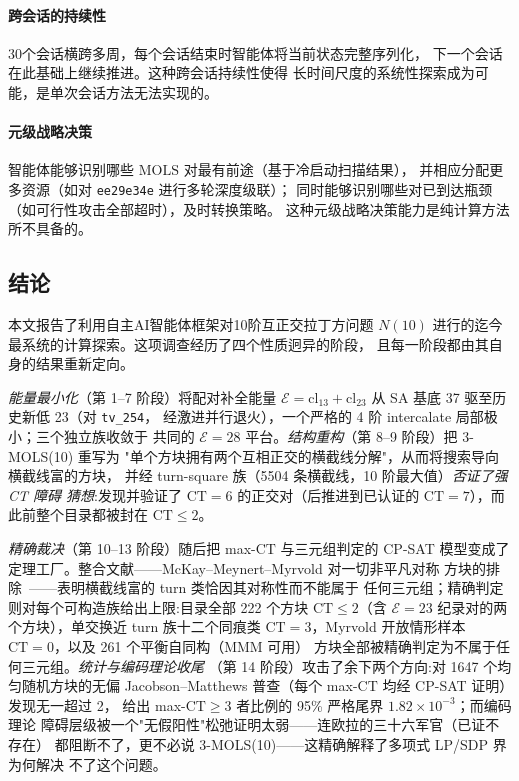 \documentclass[11pt,a4paper]{ctexart}
\theoremstyle{remark}
\newcommand{\CT}{\mathrm{CT}}
\newcommand{\cl}{\mathrm{cl}}
\newcommand{\E}{\mathcal{E}}
\newcommand{\MOLS}{\mathrm{MOLS}}
\begin{document}
\paragraph{跨会话的持续性}
30个会话横跨多周，每个会话结束时智能体将当前状态完整序列化，
下一个会话在此基础上继续推进。这种跨会话持续性使得
长时间尺度的系统性探索成为可能，是单次会话方法无法实现的。

\paragraph{元级战略决策}
智能体能够识别哪些 $\MOLS$ 对最有前途（基于冷启动扫描结果），
并相应分配更多资源（如对 \texttt{ee29e34e} 进行多轮深度级联）；
同时能够识别哪些对已到达瓶颈（如可行性攻击全部超时），及时转换策略。
这种元级战略决策能力是纯计算方法所不具备的。

\subsection{结论}

本文报告了利用自主AI智能体框架对10阶互正交拉丁方问题 $N(10)$
进行的迄今最系统的计算探索。这项调查经历了四个性质迥异的阶段，
且每一阶段都由其自身的结果重新定向。

\emph{能量最小化}（第 1--7 阶段）将配对补全能量
$\E = \cl_{13} + \cl_{23}$ 从 SA 基底 37 驱至历史新低 23（对 \texttt{tv\_254}，
经激进并行退火），一个严格的 4 阶 intercalate 局部极小；三个独立族收敛于
共同的 $\E=28$ 平台。\emph{结构重构}（第 8--9 阶段）把 3-MOLS(10) 重写为
"单个方块拥有两个互相正交的横截线分解"，从而将搜索导向横截线富的方块，
并经 turn-square 族（5504 条横截线，10 阶最大值）\emph{否证了强 CT 障碍
猜想}:发现并验证了 $\CT = 6$ 的正交对（后推进到已认证的 $\CT = 7$），而
此前整个目录都被封在 $\CT \le 2$。

\emph{精确裁决}（第 10--13 阶段）随后把 max-$\CT$ 与三元组判定的 CP-SAT
模型变成了定理工厂。整合文献——McKay--Meynert--Myrvold 对一切非平凡对称
方块的排除~\cite{mmm2007}——表明横截线富的 turn 类恰因其对称性而不能属于
任何三元组；精确判定则对每个可构造族给出上限:目录全部 222 个方块
$\CT \le 2$（含 $\E=23$ 纪录对的两个方块），单交换近 turn 族十二个同痕类
$\CT = 3$，Myrvold 开放情形样本 $\CT = 0$，以及 261 个平衡自同构（MMM 可用）
方块全部被精确判定为不属于任何三元组。\emph{统计与编码理论收尾}
（第 14 阶段）攻击了余下两个方向:对 1647 个均匀随机方块的无偏
Jacobson--Matthews 普查（每个 max-$\CT$ 均经 CP-SAT 证明）发现无一超过 2，
给出 max-$\CT \geq 3$ 者比例的 95\% 严格尾界 $1.82\times10^{-3}$；而编码理论
障碍层级被一个"无假阳性"松弛证明太弱——连欧拉的三十六军官（已证不存在）
都阻断不了，更不必说 3-MOLS(10)——这精确解释了多项式 LP/SDP 界为何解决
不了这个问题。
\end{document}

